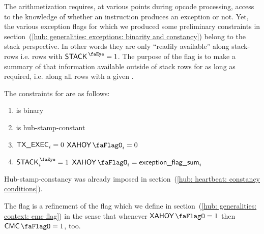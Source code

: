 The arithmetization requires, at various points during opcode processing, access to the knowledge of whether an instruction produces an exception or not.
Yet, the various exception flags for which we produced some preliminary constraints in section~(\ref{hub: generalities: exceptions: binarity and constancy}) belong to the stack perspective.
In other words they are only ``readily available'' along stack-rows i.e. rows with $\peekStack = 1$.
The purpose of the \xAhoy{} flag is to make a summary of that information available outside of stack rows for as long as required, i.e. along all rows with a given \hubStamp{}.

The constraints for \xAhoy{} are as follows:
\begin{enumerate}
	\item \xAhoy{} is binary
	\item \xAhoy{} is hub-stamp-constant
	\item \If $\textsf{TX}\textsf{\_EXEC}_{i} = 0$ \Then $\xAhoy_{i} = 0$
	\item \If $\peekStack_{i} = 1$ \Then $\xAhoy_{i} = \locExceptionFlagSum_{i}$
\end{enumerate}
\saNote{} Hub-stamp-constancy was already imposed in section~(\ref{hub: heartbeat: constancy conditions}).

\saNote{} The \xAhoy{} flag is a refinement of the \cmc{} flag which we define in section~(\ref{hub: generalities: context: cmc flag}) in the sense that whenever $\xAhoy = 1$ then $\cmc = 1$, too. 
